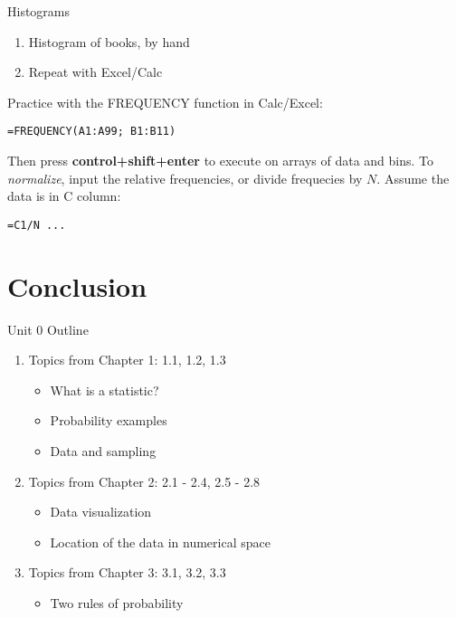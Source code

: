 \documentclass{beamer}
\begin{document}
\begin{frame}[fragile]{Histograms}
\begin{enumerate}
\item Histogram of books, by hand
\item Repeat with Excel/Calc
\end{enumerate}
Practice with the FREQUENCY function in Calc/Excel:
\begin{verbatim}
=FREQUENCY(A1:A99; B1:B11)
\end{verbatim}
Then press \alert{\textbf{control+shift+enter}} to execute on arrays of data and bins.  To \textit{normalize}, input the relative frequencies, or divide frequecies by $N$.  Assume the data is in C column:
\begin{verbatim}
=C1/N ...
\end{verbatim}
\end{frame}

\section{Conclusion}

\begin{frame}{Unit 0 Outline}
\begin{enumerate}
\item Topics from Chapter 1: 1.1, 1.2, 1.3
\begin{itemize}
\item What is a statistic?
\item Probability examples
\item Data and sampling
\end{itemize}
\item Topics from Chapter 2: 2.1 - 2.4, 2.5 - 2.8
\begin{itemize}
\item Data visualization
\item Location of the data in numerical space
\end{itemize}
\item Topics from Chapter 3: 3.1, 3.2, 3.3
\begin{itemize}
\item Two rules of probability
\end{itemize}
\end{enumerate}
\end{frame}
\end{document}
